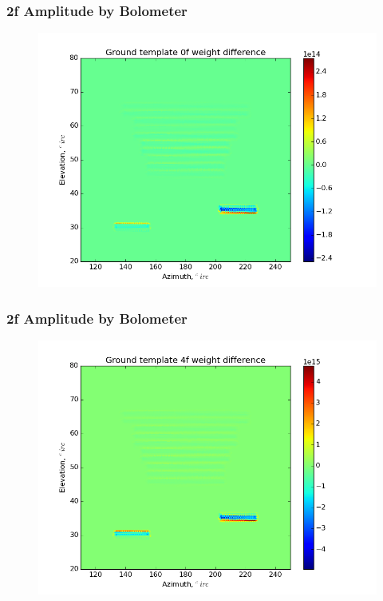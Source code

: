 \documentclass{beamer}
\begin{document}
\begin{frame}
\frametitle{2f Amplitude by Bolometer}
\begin{figure}
\includegraphics[width=0.9\linewidth]{dw0_gt_AMP_2F_BY_BOLO.png}
\end{figure}
\end{frame}

\begin{frame}
\frametitle{2f Amplitude by Bolometer}
\begin{figure}
\includegraphics[width=0.9\linewidth]{dw4_gt_AMP_2F_BY_BOLO.png}
\end{figure}
\end{frame}
\end{document}
